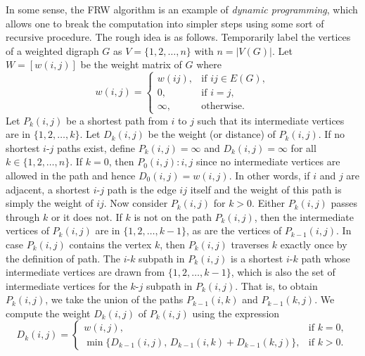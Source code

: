 In some sense, the FRW algorithm is an example of
\emph{dynamic programming}, which allows
one to break the computation into simpler steps using some sort of
recursive procedure. The rough idea is as
follows. Temporarily label the vertices of a weighted digraph $G$ as
$V = \{1,2,\dots,n\}$ with $n = |V(G)|$. Let $W = [w(i,j)]$ be the
weight matrix of $G$ where
\begin{equation}
\label{eq:graph_algorithms:Floyd_Roy_Warshall_weight_matrix}
w(i,j)
=
\begin{cases}
w(ij), & \text{if $ij \in E(G)$}, \\
0, & \text{if $i = j$}, \\
\infty, & \text{otherwise}.
\end{cases}
\end{equation}
Let $P_k(i,j)$ be a shortest path from $i$ to $j$
such that its intermediate vertices are in $\{1, 2, \dots, k\}$. Let
$D_k(i,j)$ be the weight (or distance)
of $P_k(i,j)$. If no shortest $i$-$j$ paths exist, define
$P_k(i,j) = \infty$ and $D_k(i,j) = \infty$ for all
$k \in \{1, 2, \dots, n\}$. If $k = 0$, then $P_0(i,j): i, j$ since no
intermediate vertices are allowed in the path and hence
$D_0(i,j) = w(i,j)$. In other words, if $i$ and $j$ are adjacent, a
shortest $i$-$j$ path is the edge $ij$ itself and the weight of this
path is simply the weight of $ij$. Now consider $P_k(i,j)$ for
$k > 0$. Either $P_k(i,j)$ passes through $k$ or it does not. If $k$
is not on the path $P_k(i,j)$, then the intermediate vertices of
$P_k(i,j)$ are in  $\{1, 2, \dots, k-1\}$, as are the vertices of
$P_{k-1}(i,j)$. In case $P_k(i,j)$ contains the vertex $k$, then
$P_k(i,j)$ traverses $k$ exactly once by the definition of path. The
$i$-$k$ subpath in $P_k(i,j)$ is a shortest $i$-$k$ path whose
intermediate vertices are drawn from $\{1, 2, \dots, k-1\}$, which is
also the set of intermediate vertices for the $k$-$j$ subpath in
$P_k(i,j)$. That is, to obtain $P_k(i,j)$, we take the union of the
paths $P_{k-1}(i,k)$ and $P_{k-1}(k,j)$. We compute the weight
$D_k(i,j)$ of $P_k(i,j)$ using the expression
\begin{equation}
\label{eq:graph_algorithms:Floyd_Roy_Warshall:shortest_path_weights}
D_k(i,j)
=
\begin{cases}
w(i,j), & \text{if $k = 0$}, \\
\min\{D_{k-1}(i,j),\, D_{k-1}(i,k) + D_{k-1}(k,j)\}, & \text{if $k > 0$}.
\end{cases}
\end{equation}

